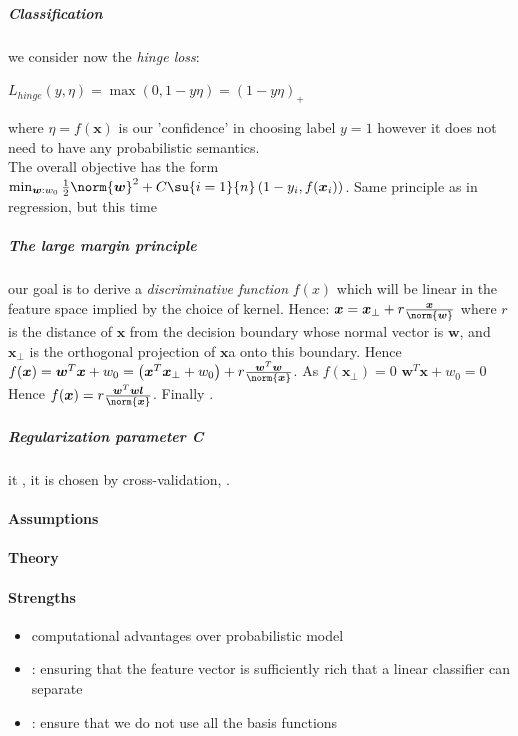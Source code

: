 \subparagraph{Classification}
we consider now the \emph{hinge loss}:
\begin{center}
    $L_{hinge}(y,\eta) = \max\left(0, 1-y\eta\right) = \left(1-y\eta\right)_{+}$
\end{center}
where $\eta=f(\bm{x})$ is our 'confidence' in choosing label $y=1$ however it does not
need to have any probabilistic semantics.\\
The overall objective has the form $\min_{\bm{w}:w_{0}}\frac{1}{2}\norm{\bm{w}}^{2} +
C\su{i=1}{n}\left(1-y_{i},f(\bm{x}_{i})\right)$. Same principle as in regression, but
this time 
\subparagraph{The large margin principle}
our goal is to derive a \emph{discriminative function} $f(x)$ which will be linear in the feature
space implied by the choice of kernel. Hence: $\bm{x} = \bm{x}_{\perp} + 
r\frac{\bm{x}}{\norm{\bm{w}}}$ where $r$ is the distance of $\bm{x}$ from the decision boundary 
whose normal vector is $\bm{w}$, and $\bm{x}_{\perp}$ is the orthogonal projection of $\bm{x}$a 
onto this boundary. Hence $f(\bm{x}) = \bm{w}^{T}\bm{x} +w_{0} = \left(\bm{x}^{T}\bm{x}_{\perp}
+ w_{0}\right) + r\frac{\bm{w}^{T}\bm{w}}{\norm{\bm{x}}}$. As $f(\bm{x}_{\perp}) = 0$ 
$\bm{w}^{T}\bm{x} +w_{0} = 0$ Hence $f(\bm{x}) = r\frac{\bm{w}^{T}\bm{wl}}{\norm{\bm{x}}}$.
Finally .
\subparagraph{Regularization parameter \emph{C}}
it , it is chosen by
cross-validation, .

\paragraph{Assumptions}
\paragraph{Theory}
\paragraph{Strengths}
\begin{itemize}
    \item computational advantages over probabilistic model
    \item {}: ensuring that the feature 
        vector is sufficiently rich that a linear classifier can separate
    \item {}: 
        ensure that we do not use all the basis functions

\end{itemize}

